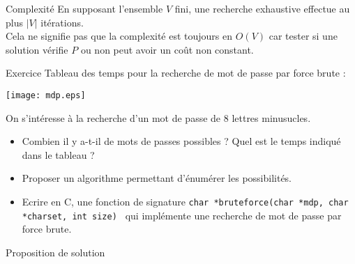 \documentclass[10pt]{beamer}
\begin{document}
\begin{frame}[fragile]{\Ctitle}{\stitle}
	\begin{block}{Complexité}
		En supposant l'ensemble $V$ fini, une recherche exhaustive effectue au plus $|V|$ itérations.\\
		\textcolor{BrickRed}{\small \danger} Cela ne signifie pas que la complexité est toujours en $O(V)$ car tester si une solution vérifie $P$ ou non peut avoir un coût non constant.
	\end{block}
\end{frame}

\begin{frame}[fragile]{\Ctitle}{\stitle}
	\begin{exampleblock}{Exercice}
		Tableau des temps pour la recherche de mot de passe par force brute :
		\begin{center}
			\texttt{[image: mdp.eps]}
		\end{center}
		On s'intéresse à la recherche d'un mot de passe de 8 lettres minusucles.
		\begin{itemize}
			\item<2-> Combien il y a-t-il de mots de passes possibles ? Quel est le temps indiqué dans le tableau ?
			\item<3-> Proposer un algorithme permettant d'énumérer les possibilités.
			\item<4-> Ecrire en C, une fonction de signature \texttt{char *bruteforce(char *mdp, char *charset, int size)
				} qui implémente une recherche de mot de passe par force brute.
		\end{itemize}
	\end{exampleblock}
\end{frame}

\begin{frame}[fragile]{\Ctitle}{\stitle}
	\begin{exampleblock}{Proposition de solution}
	\end{exampleblock}
\end{frame}
\end{document}
